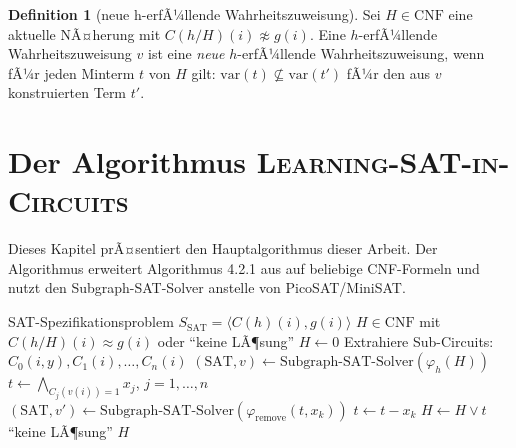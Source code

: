 ﻿\documentclass[a4paper,12pt]{article}
\theoremstyle{definition}
\newtheorem{definition}{Definition}
\begin{document}
\begin{definition}[neue h-erfÃ¼llende Wahrheitszuweisung]
    Sei $H \in \text{CNF}$ eine aktuelle NÃ¤herung mit $C(h/H)(i) \not\approx g(i)$. Eine $h$-erfÃ¼llende Wahrheitszuweisung $v$ ist eine \textit{neue} $h$-erfÃ¼llende Wahrheitszuweisung, wenn fÃ¼r jeden Minterm $t$ von $H$ gilt: $\text{var}(t) \not\subseteq \text{var}(t')$ fÃ¼r den aus $v$ konstruierten Term $t'$.
\end{definition}

\section{Der Algorithmus \textsc{Learning-SAT-in-Circuits}}

Dieses Kapitel prÃ¤sentiert den Hauptalgorithmus dieser Arbeit. Der Algorithmus erweitert Algorithmus 4.2.1 aus \cite{Epp13} auf beliebige CNF-Formeln und nutzt den Subgraph-SAT-Solver anstelle von PicoSAT/MiniSAT.

\begin{algorithm}[h]
    \caption{\textsc{Learning-SAT-in-Circuits}}\label{alg:learning-sat}
    \begin{algorithmic}[1]
        \Require SAT-Spezifikationsproblem $S_{\text{SAT}} = \langle C(h)(i), g(i) \rangle$
        \Ensure $H \in \text{CNF}$ mit $C(h/H)(i) \approx g(i)$ oder ``keine LÃ¶sung''
        \State $H \gets 0$ 
        \State Extrahiere Sub-Circuits: $C_0(i,y), C_1(i), \ldots, C_n(i)$
         \label{line:equiv-check}
            \State $(\text{SAT}, v) \gets \text{Subgraph-SAT-Solver}(\varphi_h(H))$ \label{line:new-hsatisfying}
                \State $t \gets \bigwedge_{C_j(v(i))=1} x_j$, $j = 1, \ldots, n$ \label{line:build-term}
                 \label{line:reduce-loop}
                    \State $(\text{SAT}, v') \gets \text{Subgraph-SAT-Solver}(\varphi_{\text{remove}}(t, x_k))$
                        \State $t \gets t - x_k$ \label{line:remove-var}
                    \EndIf
                \EndFor
                \State $H \gets H \lor t$ \label{line:add-term}
            \Else
                \State \Return ``keine LÃ¶sung''
            \EndIf
        \EndWhile
        \State \Return $H$
    \end{algorithmic}
\end{algorithm}
\end{document}
